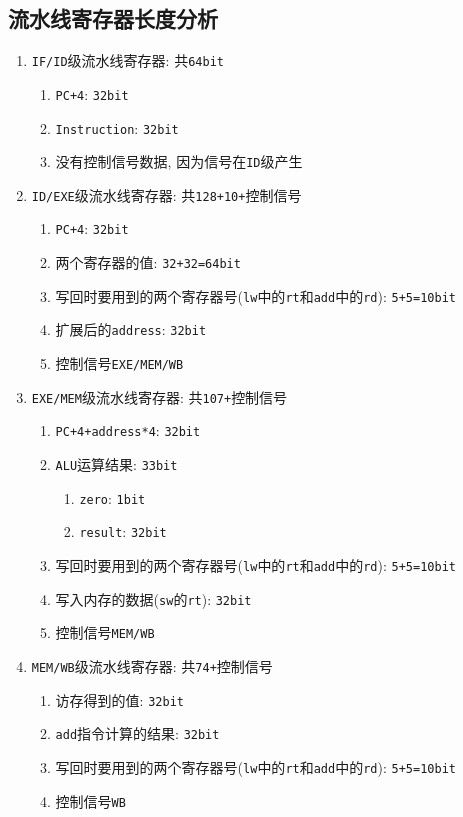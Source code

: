 \subsection{流水线寄存器长度分析}
\begin{enumerate}
\item \verb|IF/ID|级流水线寄存器: 共\verb|64bit|
\begin{enumerate}
\item \verb|PC+4|: \verb|32bit|
\item \verb|Instruction|: \verb|32bit|
\item 没有控制信号数据, 因为信号在\verb|ID|级产生
\end{enumerate}
\item \verb|ID/EXE|级流水线寄存器: 共\verb|128+10+|控制信号
\begin{enumerate}
\item \verb|PC+4|: \verb|32bit|
\item 两个寄存器的值: \verb|32+32=64bit|
\item 写回时要用到的两个寄存器号(\verb|lw|中的\verb|rt|和\verb|add|中的\verb|rd|): \verb|5+5=10bit|
\item 扩展后的\verb|address|: \verb|32bit|
\item 控制信号\verb|EXE/MEM/WB|
\end{enumerate}
\item \verb|EXE/MEM|级流水线寄存器: 共\verb|107+|控制信号
\begin{enumerate}
\item \verb|PC+4+address*4|: \verb|32bit|
\item \verb|ALU|运算结果: \verb|33bit|
\begin{enumerate}
\item \verb|zero|: \verb|1bit|
\item \verb|result|: \verb|32bit|
\end{enumerate}
\item 写回时要用到的两个寄存器号(\verb|lw|中的\verb|rt|和\verb|add|中的\verb|rd|): \verb|5+5=10bit|
\item 写入内存的数据(\verb|sw|的\verb|rt|): \verb|32bit|
\item 控制信号\verb|MEM/WB|
\end{enumerate}
\item \verb|MEM/WB|级流水线寄存器: 共\verb|74+|控制信号
\begin{enumerate}
\item 访存得到的值: \verb|32bit|
\item \verb|add|指令计算的结果: \verb|32bit|
\item 写回时要用到的两个寄存器号(\verb|lw|中的\verb|rt|和\verb|add|中的\verb|rd|): \verb|5+5=10bit|
\item 控制信号\verb|WB|
\end{enumerate}
\end{enumerate}
